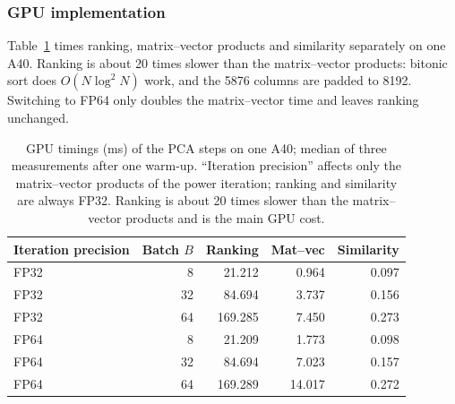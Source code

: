 \documentclass[11pt,a4paper]{article}
\begin{document}
\subsubsection{GPU implementation}
Table~\ref{tab:pca-kernels} times ranking, matrix--vector products and similarity separately on one A40. Ranking is about 20 times slower than the matrix--vector products: bitonic sort does $O(N\log^2N)$ work, and the 5876 columns are padded to 8192. Switching to FP64 only doubles the matrix--vector time and leaves ranking unchanged.
\begin{table}[H]
\centering\small
\caption{GPU timings (ms) of the PCA steps on one A40; median of three measurements after one warm-up. ``Iteration precision'' affects only the matrix--vector products of the power iteration; ranking and similarity are always FP32. Ranking is about 20 times slower than the matrix--vector products and is the main GPU cost.}
\label{tab:pca-kernels}
\begin{tabular}{lrrrr}
\toprule
Iteration precision & Batch $B$ & Ranking & Mat--vec & Similarity \\
\midrule
FP32 & 8  & 21.212  & 0.964  & 0.097 \\
FP32 & 32 & 84.694  & 3.737  & 0.156 \\
FP32 & 64 & 169.285 & 7.450  & 0.273 \\
FP64 & 8  & 21.209  & 1.773  & 0.098 \\
FP64 & 32 & 84.694  & 7.023  & 0.157 \\
FP64 & 64 & 169.289 & 14.017 & 0.272 \\
\bottomrule
\end{tabular}
\end{table}
\end{document}
